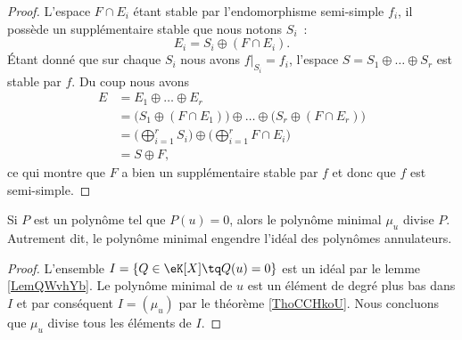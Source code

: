 \begin{proof}
    L'espace \( F\cap E_i\) étant stable par l'endomorphisme semi-simple \( f_i\), il possède un supplémentaire stable que nous notons \( S_i\)~:
    \begin{equation}
        E_i=S_i\oplus(F\cap E_i).
    \end{equation}
    Étant donné que sur chaque \( S_i\) nous avons \( f|_{S_i}=f_i\), l'espace \( S=S_1\oplus\ldots\oplus S_r\) est stable par \( f\). Du coup nous avons
    \begin{subequations}
        \begin{align}
            E&=E_1\oplus\ldots\oplus E_r\\
            &=\big( S_1\oplus(F\cap E_1) \big)\oplus\ldots\oplus\big( S_r\oplus(F\cap E_r) \big)\\
            &=\big( \bigoplus_{i=1}^rS_i \big)\oplus\big( \bigoplus_{i=1}^rF\cap E_i \big)\\
            &=S\oplus F,
        \end{align}
    \end{subequations}
    ce qui montre que \( F\) a bien un supplémentaire stable par \( f\) et donc que \( f\) est semi-simple.
\end{proof}

\begin{proposition}     \label{PropAnnncEcCxj}
    Si \( P\) est un polynôme tel que \( P(u)=0\), alors le polynôme minimal \( \mu_u\) divise \( P\). Autrement dit, le polynôme minimal engendre l'idéal des polynômes annulateurs.
\end{proposition}

\begin{proof}
    L'ensemble \( I=\{ Q\in \eK[X]\tq Q(u)=0 \}\) est un idéal par le lemme \ref{LemQWvhYb}. Le polynôme minimal de \( u\) est un élément de degré plus bas dans \( I\) et par conséquent \( I=(\mu_u)\) par le théorème \ref{ThoCCHkoU}. Nous concluons que \( \mu_u\) divise tous les éléments de \( I\).
\end{proof}

